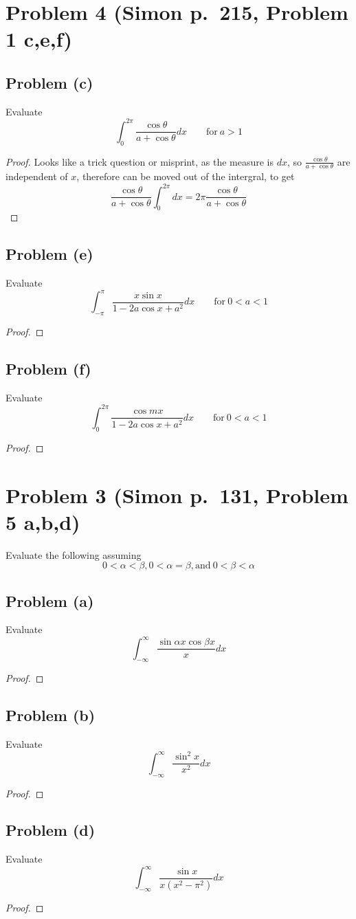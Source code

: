 \documentclass{article}[12pt]
\begin{document}
\section*{Problem 4 (Simon p.~215, Problem 1 c,e,f)}
\subsection*{Problem (c)}Evaluate
\[
\int_0^{2\pi} \frac{\cos \theta}{a+\cos \theta} dx\qquad \mbox{for}\ a>1
\]
\begin{proof}
Looks like a trick question or misprint, as the measure is $dx$, so
$\frac{\cos \theta}{a+\cos\theta}$ are independent of $x$, therefore
can be moved out of the intergral, to get 
\[
\frac{\cos \theta}{a+\cos\theta} \int_0^{2\pi} dx = 2\pi\frac{\cos \theta}{a+\cos\theta}
\]
\end{proof}

\subsection*{Problem (e)}Evaluate
\[
\int_{-\pi}^{\pi} \frac{x\sin x}{1-2a\cos x+a^2} dx\qquad \mbox{for}\ 0<a<1
\]
\begin{proof}

\end{proof}

\subsection*{Problem (f)}Evaluate
\[
\int_{0}^{2\pi} \frac{\cos mx}{1-2a\cos x+a^2} dx\qquad \mbox{for}\ 0<a<1
\]
\begin{proof}

\end{proof}



\section*{Problem 3 (Simon p.~131, Problem 5 a,b,d)}
Evaluate the following assuming
\[
0 < \alpha < \beta, 0 < \alpha = \beta, \mbox{and}\ 0 < \beta < \alpha
\]
\subsection*{Problem (a)}Evaluate
\[
\int_{-\infty}^{\infty} \frac{\sin \alpha x\cos \beta x}{x} dx
\]
\begin{proof}

\end{proof}

\subsection*{Problem (b)}Evaluate
\[
\int_{-\infty}^{\infty} \frac{\sin^2 x}{x^2} dx
\]
\begin{proof}

\end{proof}

\subsection*{Problem (d)}Evaluate
\[
\int_{-\infty}^{\infty} \frac{\sin x}{x(x^2-\pi^2)} dx
\]
\begin{proof}

\end{proof}
\end{document}

